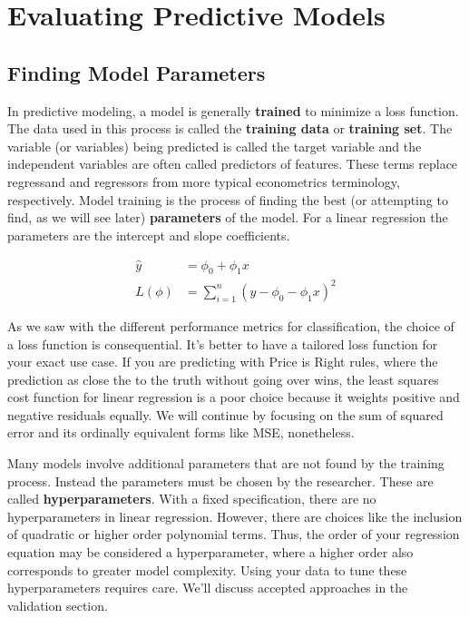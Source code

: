 \section{Evaluating Predictive Models}

\subsection{Finding Model Parameters}
In predictive modeling, a model is generally \textbf{trained} to minimize a loss function. The data used in this process is called the \textbf{training data} or \textbf{training set}. The variable (or variables) being predicted is called the target variable and the independent variables are often called predictors of features.
These terms replace regressand and regressors from more typical econometrics terminology, respectively. 
Model training is the process of finding the best (or attempting to find, as we will see later)  \textbf{parameters} of the model. 
For a linear regression the parameters are the intercept and slope coefficients. 

\begin{align}
\hat{y} &= \phi_0 + \phi_1x \tag{regression specification} \\
L(\phi) &= \sum_{i=1}^n (y-\phi_0 -\phi_1x)^2 \tag{loss or cost over training data}
\label{eq:linear-loss}
\end{align}

As we saw with the different performance metrics for classification, the choice of a loss function is consequential. It's better to have a tailored loss function for your exact use case.
If you are predicting with Price is Right rules, where the prediction as close the to the truth without going over wins, the least squares cost function for linear regression is a poor choice because it weights positive and negative residuals equally.
We will continue by focusing on the sum of squared error and its ordinally equivalent forms like MSE, nonetheless. 

Many models involve additional parameters that are not found by the training process. Instead the parameters must be chosen by the researcher. These are called \textbf{hyperparameters}.
With a fixed specification, there are no hyperparameters in linear regression. However, there are choices like the inclusion of quadratic or higher order polynomial terms. Thus, the order of your regression equation may be considered a hyperparameter, where a higher order also corresponds to greater model complexity. 
Using your data to tune these hyperparameters requires care. We'll discuss accepted approaches in the validation section. 

